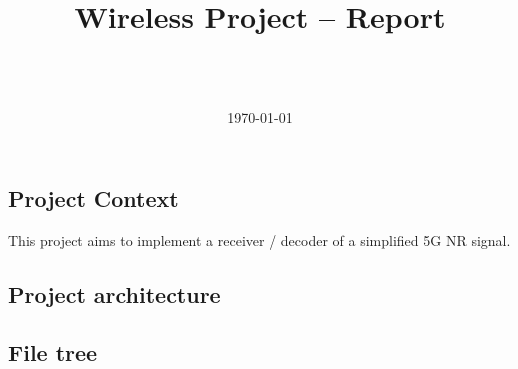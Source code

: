 \documentclass[a4paper, 12pt, twoside]{article}
\title{Wireless Project -- Report}
\author{
    \\ \NameA
    \\ \NameB
}
\date{
    \today
}
\begin{document}
    
    \maketitle

    \tableofcontents
    \newpage

    \begin{indt}{\section{Project Context}} %
        This project aims to implement a receiver / decoder of a simplified 5G NR signal.
    \end{indt} %

    \begin{indt}{\section{Project architecture}}%
        \begin{indt}{\subsection{File tree}} %
            \begin{figure}[H]%
                \centering
        

\end{figure}
\end{indt}
\end{indt}
\end{document}
